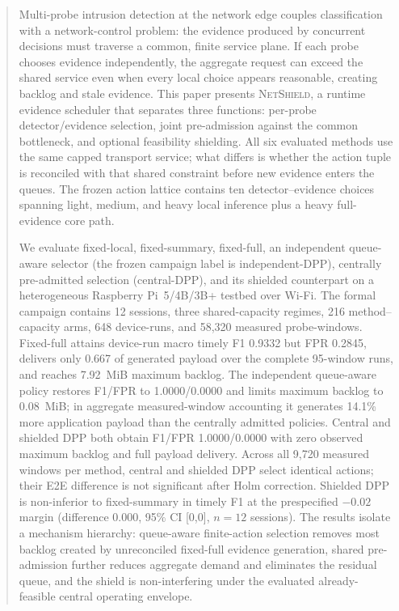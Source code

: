 \documentclass[10pt,journal]{IEEEtran}
\newcommand{\NetShield}{\textsc{NetShield}}
\begin{document}
\begin{abstract}
Multi-probe intrusion detection at the network edge couples classification with a network-control problem: the evidence produced by concurrent decisions must traverse a common, finite service plane. If each probe chooses evidence independently, the aggregate request can exceed the shared service even when every local choice appears reasonable, creating backlog and stale evidence. This paper presents \NetShield, a runtime evidence scheduler that separates three functions: per-probe detector/evidence selection, joint pre-admission against the common bottleneck, and optional feasibility shielding. All six evaluated methods use the same capped transport service; what differs is whether the action tuple is reconciled with that shared constraint before new evidence enters the queues. The frozen action lattice contains ten detector--evidence choices spanning light, medium, and heavy local inference plus a heavy full-evidence core path.

We evaluate fixed-local, fixed-summary, fixed-full, an independent queue-aware selector (the frozen campaign label is independent-DPP), centrally pre-admitted selection (central-DPP), and its shielded counterpart on a heterogeneous Raspberry Pi~5/4B/3B+ testbed over Wi-Fi. The formal campaign contains 12 sessions, three shared-capacity regimes, 216 method--capacity arms, 648 device-runs, and 58,320 measured probe-windows. Fixed-full attains device-run macro timely F1 0.9332 but FPR 0.2845, delivers only 0.667 of generated payload over the complete 95-window runs, and reaches 7.92~MiB maximum backlog. The independent queue-aware policy restores F1/FPR to 1.0000/0.0000 and limits maximum backlog to 0.08~MiB; in aggregate measured-window accounting it generates 14.1\% more application payload than the centrally admitted policies. Central and shielded DPP both obtain F1/FPR 1.0000/0.0000 with zero observed maximum backlog and full payload delivery. Across all 9,720 measured windows per method, central and shielded DPP select identical actions; their E2E difference is not significant after Holm correction. Shielded DPP is non-inferior to fixed-summary in timely F1 at the prespecified $-0.02$ margin (difference 0.000, 95\% CI [0,0], $n=12$ sessions). The results isolate a mechanism hierarchy: queue-aware finite-action selection removes most backlog created by unreconciled fixed-full evidence generation, shared pre-admission further reduces aggregate demand and eliminates the residual queue, and the shield is non-interfering under the evaluated already-feasible central operating envelope.
\end{abstract}
\end{document}
